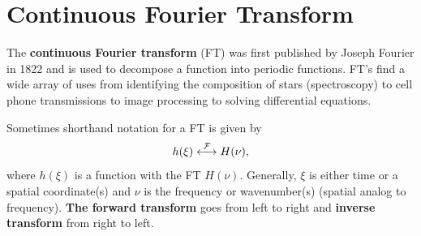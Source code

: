 


\section{Continuous Fourier Transform}

The {\bf continuous Fourier transform} (FT) was first published by Joseph Fourier in 1822 and is used to decompose a function into periodic functions.  FT's find a wide array of uses from identifying the composition of stars (spectroscopy) to cell phone transmissions to image processing to solving differential equations.

Sometimes shorthand notation for a FT is given by 
\[
    h(\xi) \overset{\mathcal{F}}{\longleftrightarrow} H(\nu),
\]
where $h(\xi)$ is a function with the FT $H(\nu)$.  Generally, $\xi$ is either time or a spatial coordinate(s) and $\nu$ is the frequency or wavenumber(s) (spatial analog to frequency).  {\bf The forward transform} goes from left to right and {\bf inverse transform} from right to left.

